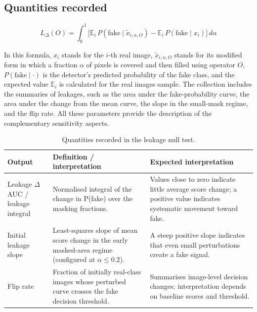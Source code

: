 \subsection{\texorpdfstring{\textbf{Quantities
recorded}}{Quantities recorded}}\label{quantities-recorded}

\begin{equation}
    L_{\Delta}(O) = \int_{0}^{1} \Big[ \mathbb{E}_i\, P(\text{fake} \mid \tilde{x}_{i,\alpha,O}) - \mathbb{E}_i\, P(\text{fake} \mid x_i) \Big] \, d\alpha
    \label{eq:leakage}
\end{equation}

In this formula, $x_i$ stands for the $i$-th real image,
$\tilde{x}_{i,\alpha,O}$ stands for its modified form in which a
fraction $\alpha$ of pixels is covered and then filled using operator
$O$, $P(\text{fake} \mid \cdot)$ is the detector's predicted probability
of the fake class, and the expected value $\mathbb{E}_i$ is calculated
for the real images sample. The collection includes the summaries of leakages, such
as the area under the fake-probability curve, the area under the change
from the mean curve, the slope in the small-mask regime, and the flip
rate. All these parameters provide the description of the complementary
sensitivity
aspects.

\begin{table}[H]
    \centering
    \caption{Quantities recorded in the leakage null test.}
    \label{tab:leakage-quantities}
    \small
    \begin{tabular}{@{}>{\raggedright\arraybackslash}p{}>{\raggedright\arraybackslash}p{}>{\raggedright\arraybackslash}p{}@{}}
        \toprule
        \textbf{Output} & \textbf{Definition / interpretation} & \textbf{Expected interpretation} \\
        \midrule
        Leakage $\Delta$AUC / leakage integral & Normalised integral of the change in P(fake) over the masking fractions. & Values close to zero indicate little average score change; a positive value indicates systematic movement toward fake. \\
        \addlinespace
        Initial leakage slope & Least-squares slope of mean score change in the early masked-area regime (configured at $\alpha \leq 0.2$). & A steep positive slope indicates that even small perturbations create a fake signal. \\
        \addlinespace
        Flip rate & Fraction of initially real-class images whose perturbed curve crosses the fake decision threshold. & Summarises image-level decision changes; interpretation depends on baseline scores and threshold. \\
        \bottomrule
    \end{tabular}
\end{table}

